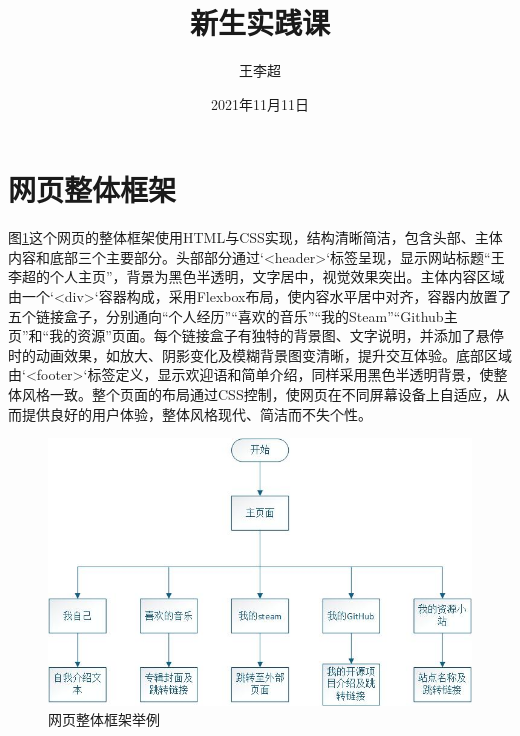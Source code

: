 \documentclass[supercite]{Experimental_Report}
\title{~~~~~~新生实践课~~~~~~}
\author{王李超}
\date{2021年11月11日}
\theoremstyle{definition}
\begin{document}
\maketitle

\clearpage


\tableofcontents[level=2]
\clearpage


\section{网页整体框架}

图\ref{fig1-1}这个网页的整体框架使用HTML与CSS实现，结构清晰简洁，包含头部、主体内容和底部三个主要部分。头部部分通过`<header>`标签呈现，显示网站标题“王李超的个人主页”，背景为黑色半透明，文字居中，视觉效果突出。主体内容区域由一个`<div>`容器构成，采用Flexbox布局，使内容水平居中对齐，容器内放置了五个链接盒子，分别通向“个人经历”“喜欢的音乐”“我的Steam”“Github主页”和“我的资源”页面。每个链接盒子有独特的背景图、文字说明，并添加了悬停时的动画效果，如放大、阴影变化及模糊背景图变清晰，提升交互体验。底部区域由`<footer>`标签定义，显示欢迎语和简单介绍，同样采用黑色半透明背景，使整体风格一致。整个页面的布局通过CSS控制，使网页在不同屏幕设备上自适应，从而提供良好的用户体验，整体风格现代、简洁而不失个性。


\begin{figure}[htb] %
	\begin{center}
		\includegraphics[scale=0.80]{images/1-1.jpg}
		\caption{网页整体框架举例}
		\label{fig1-1}
	\end{center}
\end{figure}
\end{document}
